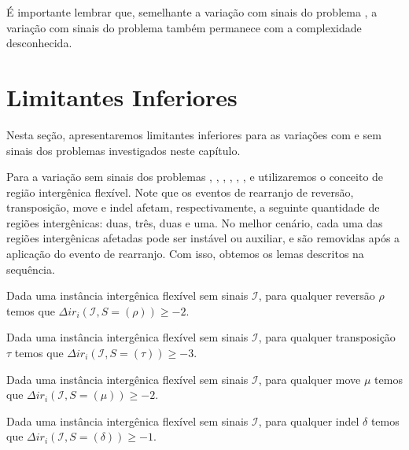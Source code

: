 É importante lembrar que, semelhante a variação com sinais do problema \SbIRI{}, a variação com sinais do problema \SbFIRI{} também permanece com a complexidade desconhecida.

\section{Limitantes Inferiores}

Nesta seção, apresentaremos limitantes inferiores para as variações com e sem sinais dos problemas investigados neste capítulo.

Para a variação sem sinais dos problemas \SbFIR{}, \SbFIRI{}, \SbFIRM{}, \SbFIRMI{}, \SbFIRT{}, \SbFIRTI{}, \SbFIRTM{} e  \SbFIRTMI{} utilizaremos o conceito de região intergênica flexível. Note que os eventos de rearranjo de reversão, transposição, move e indel afetam, respectivamente, a seguinte quantidade de regiões intergênicas: duas, três, duas e uma. No melhor cenário, cada uma das regiões intergênicas afetadas pode ser instável ou auxiliar, e são removidas após a aplicação do evento de rearranjo. Com isso, obtemos os lemas descritos na sequência.

\begin{lemma}\label{lemma:VJKGLBQG}
Dada uma instância intergênica flexível sem sinais $\mathcal{I}$, para qualquer reversão $\rho$ temos que $\Delta ir_i(\mathcal{I}, S = (\rho)) \ge -2$.
\end{lemma}

\begin{lemma}\label{lemma:XLUTQDGV}
Dada uma instância intergênica flexível sem sinais $\mathcal{I}$, para qualquer transposição $\tau$ temos que $\Delta ir_i(\mathcal{I}, S = (\tau)) \ge -3$.
\end{lemma}

\begin{lemma}\label{lemma:ZOCGWWGV}
Dada uma instância intergênica flexível sem sinais $\mathcal{I}$, para qualquer move $\mu$ temos que $\Delta ir_i(\mathcal{I}, S = (\mu)) \ge -2$.
\end{lemma}

\begin{lemma}\label{lemma:HQJMMZCU}
Dada uma instância intergênica flexível sem sinais $\mathcal{I}$, para qualquer indel $\delta$ temos que $\Delta ir_i(\mathcal{I}, S = (\delta)) \ge -1$.
\end{lemma}


